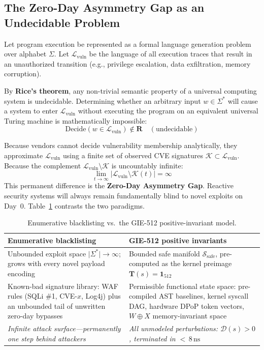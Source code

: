 \documentclass{portalciencia}
\theoremstyle{plain}
\theoremstyle{definition}
\begin{document}
\subsection{The Zero-Day Asymmetry Gap as an Undecidable Problem}

Let program execution be represented as a formal language generation problem over alphabet $\Sigma$. Let $\mathcal{L}_{\mathrm{vuln}}$ be the language of all execution traces that result in an unauthorized transition (e.g., privilege escalation, data exfiltration, memory corruption).

By \textbf{Rice's theorem}, any non-trivial semantic property of a universal computing system is undecidable. Determining whether an arbitrary input $w \in \Sigma^{*}$ will cause a system to enter $\mathcal{L}_{\mathrm{vuln}}$ without executing the program on an equivalent universal Turing machine is mathematically impossible:
\begin{equation}
\label{eq:undecidable}
\mathrm{Decide}\left( w \in \mathcal{L}_{\mathrm{vuln}} \right) \notin \mathbf{R} \quad (\text{undecidable})
\end{equation}

Because vendors cannot decide vulnerability membership analytically, they approximate $\mathcal{L}_{\mathrm{vuln}}$ using a finite set of observed CVE signatures $\mathcal{K} \subset \mathcal{L}_{\mathrm{vuln}}$. Because the complement $\mathcal{L}_{\mathrm{vuln}} \setminus \mathcal{K}$ is uncountably infinite:
\begin{equation}
\label{eq:gap}
\lim_{t \to \infty} \left| \mathcal{L}_{\mathrm{vuln}} \setminus \mathcal{K}(t) \right| = \infty
\end{equation}
This permanent difference is the \textbf{Zero-Day Asymmetry Gap}. Reactive security systems will always remain fundamentally blind to novel exploits on Day~0. Table~\ref{tab:blacklist} contrasts the two paradigms.

\begin{table}[ht]
\centering
\caption{Enumerative blacklisting vs.\ the GIE-512 positive-invariant model.}
\label{tab:blacklist}
\begin{tabular}{p{6.1cm}p{6.1cm}}
\toprule
\textbf{Enumerative blacklisting} & \textbf{GIE-512 positive invariants} \\
\midrule
Unbounded exploit space $\lvert\Sigma^{*}\rvert \to \infty$; grows with every novel payload encoding &
Bounded safe manifold $\mathcal{S}_{\mathrm{safe}}$, pre-computed as the kernel preimage $\mathbf{T}(s)=\mathbf{1}_{512}$ \\
\addlinespace
Known-bad signature library: WAF rules (SQLi \#1, CVE-$x$, Log4j) plus an unbounded tail of unwritten zero-day bypasses &
Permissible functional state space: pre-compiled AST baselines, kernel syscall DAG, hardware DPoP token vectors, $W \oplus X$ memory-invariant space \\
\addlinespace
\emph{Infinite attack surface---permanently one step behind attackers} &
\emph{All unmodeled perturbations: $\mathcal{D}(s) > 0$, terminated in ${<}\,8\,\mathrm{ns}$} \\
\bottomrule
\end{tabular}
\end{table}
\end{document}
